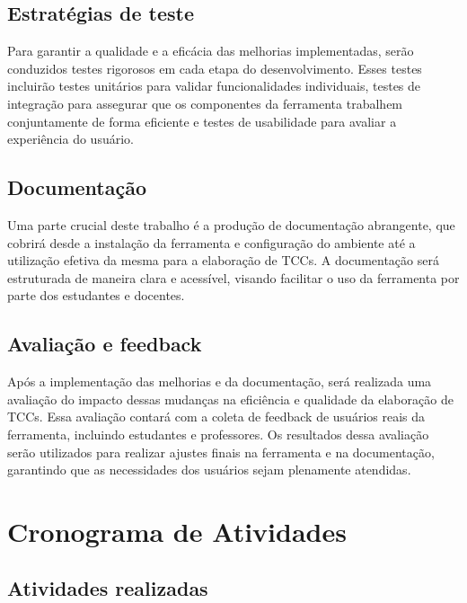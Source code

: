 \documentclass[
	12pt,				%
	oneside,			%
	a4paper,			%
	english,			%
	french,				%
	spanish,			%
	brazil				%
	]{abntex2}
\begin{document}
\hypertarget{estratuxe9gias-de-teste}{%
\section{Estratégias de teste}\label{estratuxe9gias-de-teste}}

Para garantir a qualidade e a eficácia das melhorias implementadas,
serão conduzidos testes rigorosos em cada etapa do desenvolvimento.
Esses testes incluirão testes unitários para validar funcionalidades
individuais, testes de integração para assegurar que os componentes da
ferramenta trabalhem conjuntamente de forma eficiente e testes de
usabilidade para avaliar a experiência do usuário.

\hypertarget{documentauxe7uxe3o}{%
\section{Documentação}\label{documentauxe7uxe3o}}

Uma parte crucial deste trabalho é a produção de documentação
abrangente, que cobrirá desde a instalação da ferramenta e configuração
do ambiente até a utilização efetiva da mesma para a elaboração de TCCs.
A documentação será estruturada de maneira clara e acessível, visando
facilitar o uso da ferramenta por parte dos estudantes e docentes.

\hypertarget{avaliauxe7uxe3o-e-feedback}{%
\section{Avaliação e feedback}\label{avaliauxe7uxe3o-e-feedback}}

Após a implementação das melhorias e da documentação, será realizada uma
avaliação do impacto dessas mudanças na eficiência e qualidade da
elaboração de TCCs. Essa avaliação contará com a coleta de feedback de
usuários reais da ferramenta, incluindo estudantes e professores. Os
resultados dessa avaliação serão utilizados para realizar ajustes finais
na ferramenta e na documentação, garantindo que as necessidades dos
usuários sejam plenamente atendidas.

\hypertarget{cronograma-de-atividades}{%
\chapter{Cronograma de Atividades}\label{cronograma-de-atividades}}

\hypertarget{atividades-realizadas}{%
\section{Atividades realizadas}\label{atividades-realizadas}}
\end{document}
